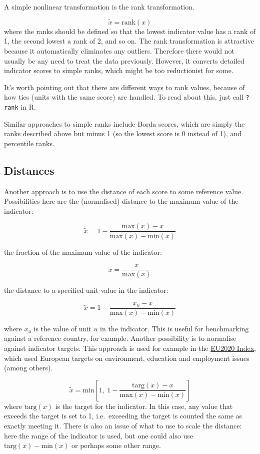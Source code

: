 \documentclass[
]{book}
\begin{document}
A simple nonlinear transformation is the rank transformation.

\[ \tilde{x} = \text{rank}(x)\]
where the ranks should be defined so that the lowest indicator value has a rank of 1, the second lowest a rank of 2, and so on. The rank transformation is attractive because it automatically eliminates any outliers. Therefore there would not usually be any need to treat the data previously. However, it converts detailed indicator scores to simple ranks, which might be too reductionist for some.

It's worth pointing out that there are different ways to rank values, because of how ties (units with the same score) are handled. To read about this, just call \texttt{?rank} in R.

Similar approaches to simple ranks include Borda scores, which are simply the ranks described above but minus 1 (so the lowest score is 0 instead of 1), and percentile ranks.

\hypertarget{distances}{%
\subsection{Distances}\label{distances}}

Another approach is to use the distance of each score to some reference value. Possibilities here are the (normalised) distance to the maximum value of the indicator:

\[ \tilde{x} = 1 - \frac{\text{max}(x) - x}{\text{max}(x) - \text{min}(x)}\]

the fraction of the maximum value of the indicator:

\[ \tilde{x} = \frac{x}{\text{max}(x)}\]

the distance to a specified unit value in the indicator:

\[ \tilde{x} = 1 - \frac{x_u - x}{\text{max}(x) - \text{min}(x)}\]

where \(x_u\) is the value of unit \(u\) in the indicator. This is useful for benchmarking against a reference country, for example. Another possibility is to normalise against indicator targets. This approach is used for example in the \href{https://www.sciencedirect.com/science/article/pii/S2665972720300593}{EU2020 Index}, which used European targets on environment, education and employment issues (among others).

\[ \tilde{x} = \text{min} \left[1, \  1 - \frac{\text{targ}(x) - x}{\text{max}(x) - \text{min}(x)} \right]\]
where \(\text{targ}(x)\) is the target for the indicator. In this case, any value that exceeds the target is set to 1, i.e.~exceeding the target is counted the same as exactly meeting it. There is also an issue of what to use to scale the distance: here the range of the indicator is used, but one could also use \(\text{targ}(x) - \text{min}(x)\) or perhaps some other range.
\end{document}
